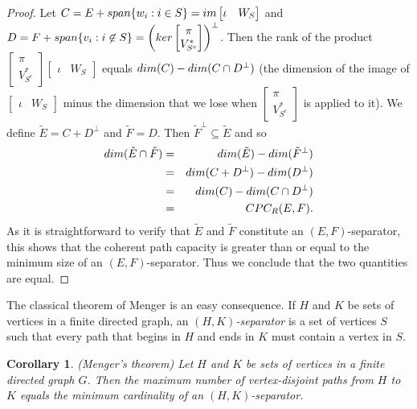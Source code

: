 \documentclass[10pt,a4paper]{amsart}
\newtheorem{cor}[thm]{Corollary}
\begin{document}
\begin{proof}
Let $C = E + {\rm span}\{w_i: i \in S\} = {\rm im}\left[\begin{matrix}\iota & W_S\end{matrix}\right]$ and $D = F + {\rm span}
\{v_i: i \not\in S\} = \left({\rm ker}\left[\begin{matrix}\pi\\ V_{S^c}^*\end{matrix}\right]\right)^\perp$. Then the rank of the product $\left[\begin{matrix}\pi\\ V_{S^c}^*\end{matrix}\right]\left[\begin{matrix}\iota & W_S\end{matrix}\right]$ equals ${\rm dim}(C) - {\rm dim}(C \cap D^\perp)$ (the dimension of the image of $\left[\begin{matrix}\iota & W_S\end{matrix}\right]$ minus the dimension that we lose when $\left[\begin{matrix}\pi\\ V_{S^c}^*\end{matrix}\right]$ is applied to it). We define $\tilde{E} = C + D^\perp$ and $\tilde{F} = D$. Then $\tilde{F}^\perp \subseteq \tilde{E}$ and so \begin{eqnarray*}{\rm dim}(\tilde{E} \cap \tilde{F}) &=& {\rm dim}(\tilde{E}) - {\rm dim}(\tilde{F}^\perp)\\ &=& {\rm dim}(C + D^\perp) - {\rm dim}(D^\perp)\\ &=&{\rm dim}(C) - {\rm dim}(C \cap D^\perp)\\ &=& CPC_R(E,F).\end{eqnarray*} As it is straightforward to verify that $\tilde{E}$ and $\tilde{F}$ constitute an $(E,F)$-separator, this shows that the coherent path capacity is greater than or equal to the minimum size of an $(E,F)$-separator. Thus we conclude that the two quantities are equal.
\end{proof}

The classical theorem of Menger is an easy consequence. If $H$ and $K$ be sets of vertices in a finite directed graph, an {\it $(H,K)$-separator} is a set of vertices $S$ such that every path that begins in $H$ and ends in $K$ must contain a vertex in $S$.

\begin{cor} (Menger's theorem)
Let $H$ and $K$ be sets of vertices in a finite directed graph $G$. Then the maximum number of vertex-disjoint paths from $H$ to $K$ equals the minimum cardinality of an $(H,K)$-separator.
\end{cor}
\end{document}
